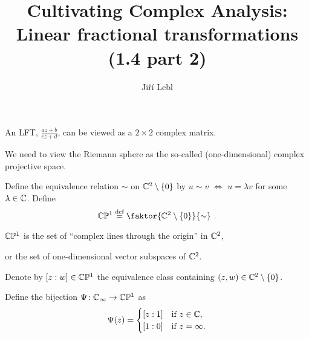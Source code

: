 \documentclass[10pt,aspectratio=169]{beamer}
\author{Ji\v{r}\'i Lebl}
\institute[OSU]{%
Departemento pri Matematiko de Oklahoma {\^S}tata Universitato}
\title{Cultivating Complex Analysis:\\%
Linear fractional transformations (1.4 part 2)}
\date{}
\begin{document}
\begin{frame}
\titlepage
\end{frame}

\begin{frame}
An LFT, $\frac{a z + b}{c z + d}$, can be viewed as a $2 \times 2$ complex matrix.

\medskip
\pause

We need to view the Riemann sphere as the so-called (one-dimensional)
complex projective space.

\medskip
\pause

Define the equivalence relation $\sim$ on ${\mathbb{C}}^2 \setminus \{ 0 \}$ by
$u \sim v$ $\Leftrightarrow$ $u = \lambda v$ for some $\lambda \in {\mathbb{C}}$.
Define
\[
\C \bP^1
\overset{\text{def}}{=}
\faktor{\C^2 \setminus \{ 0\}}{\sim} \ .
\]

\pause

${\mathbb{C}} {\mathbb{P}}^1$ is the set of ``complex lines through the
origin'' in ${\mathbb{C}}^2$,

or the set of one-dimensional vector subspaces of ${\mathbb{C}}^2$.

\medskip
\pause

Denote by $[z:w] \in {\mathbb{C}} {\mathbb{P}}^1$ the equivalence class containing
$(z,w) \in {\mathbb{C}}^2 \setminus \{0\}$.

\medskip
\pause

Define the bijection $\Psi \colon {\mathbb{C}}_\infty \to {\mathbb{C}} {\mathbb{P}}^1$ as
\begin{equation*}
\Psi(z) =
\begin{cases}
[z:1] & \text{if } z \in {\mathbb{C}} , \\
[1:0] & \text{if } z=\infty .
\end{cases}
\end{equation*}

\end{frame}
\end{document}

